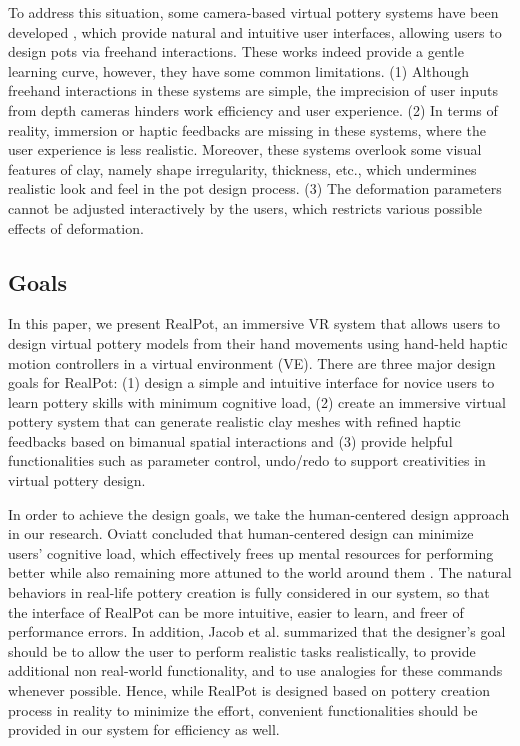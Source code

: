 \documentclass{svjour3}                     %
\begin{document}
To address this situation, some camera-based virtual pottery systems have been developed \cite{ramani2015gesture,murugappan2013handy,han2014virtual}, which provide natural and intuitive user interfaces, allowing users to design pots via freehand interactions.
These works indeed provide a gentle learning curve, however, they have some common limitations.
(1) Although freehand interactions in these systems are simple, the imprecision of user inputs from depth cameras hinders work efficiency and user experience.
%
(2) In terms of reality, immersion or haptic feedbacks are missing in these systems, where the user experience is less realistic. Moreover, these systems overlook some visual features of clay, namely shape irregularity, thickness, etc., which undermines realistic look and feel in the pot design process.
%
(3) The deformation parameters cannot be adjusted interactively by the users, which restricts various possible effects of deformation.

\subsection{Goals}
\label{sec:1.2}

In this paper, we present RealPot, an immersive VR system that allows users to design virtual pottery models from their hand movements using hand-held haptic motion controllers in a virtual environment (VE).
There are three major design goals for RealPot:
(1) design a simple and intuitive interface for novice users to learn pottery skills with minimum cognitive load,
(2) create an immersive virtual pottery system that can generate realistic clay meshes with refined haptic feedbacks based on bimanual spatial interactions 
and (3) provide helpful functionalities such as parameter control, undo/redo to support creativities in virtual pottery design.

In order to achieve the design goals, we take the human-centered design approach in our research.
Oviatt concluded that human-centered design can minimize users’ cognitive load, which effectively frees up mental resources for performing better while also remaining more attuned to the world around them \cite{oviatt2006human}.
The natural behaviors in real-life pottery creation is fully considered in our system, so that the interface of RealPot can be more intuitive, easier to learn, and freer of performance errors.
In addition, Jacob et al. \cite{Jacob2008Reality} summarized that the designer's goal should be to allow the user to perform realistic tasks realistically, to provide additional non real-world functionality, and to use analogies for these commands whenever possible.
Hence, while RealPot is designed based on pottery creation process in reality to minimize the effort, convenient functionalities should be provided in our system for efficiency as well.
\end{document}
